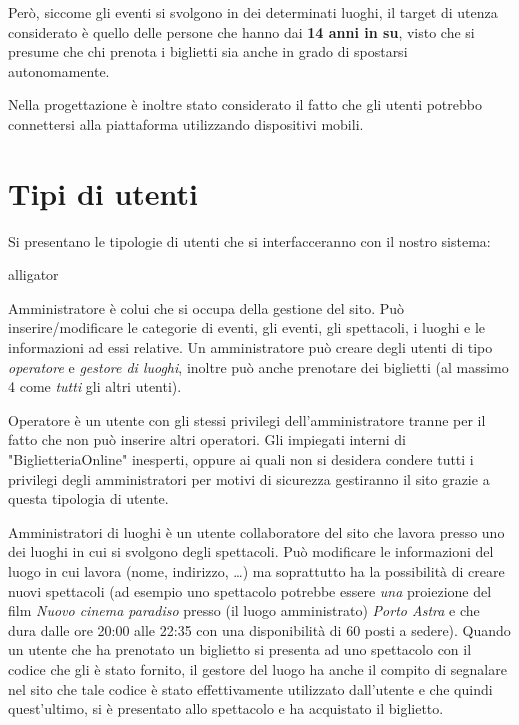 \documentclass[10pt, a4paper]{article}
\begin{document}
Però, siccome gli eventi si svolgono in dei determinati luoghi, il 
target di utenza considerato è quello delle persone che hanno dai
\textbf{14 anni in su}, visto che si presume che chi prenota i biglietti sia anche in grado 
di spostarsi autonomamente.

Nella progettazione è inoltre stato considerato il fatto che gli utenti potrebbo connettersi 
alla piattaforma utilizzando dispositivi mobili.

\section{Tipi di utenti}
Si presentano le tipologie di utenti che si interfacceranno con il nostro sistema:
\begin{labeling}{alligator}
	\item[Amministratore] è colui che si occupa della gestione del
    sito. Può inserire/modificare le categorie di eventi, gli eventi, gli spettacoli, i luoghi e le informazioni ad essi relative.
    Un amministratore può creare degli utenti di tipo \emph{operatore} e \emph{gestore di luoghi},
    inoltre può anche prenotare dei biglietti (al massimo 4 come \emph{tutti} gli altri utenti).
  	\item[Operatore] è un utente con gli stessi privilegi dell'amministratore tranne
    per il fatto che non può inserire altri operatori. Gli impiegati interni di "BiglietteriaOnline" inesperti, oppure ai quali non si desidera condere tutti i privilegi degli amministratori per motivi di sicurezza gestiranno il sito grazie a questa tipologia di utente.
	\item[Amministratori di luoghi] è un utente collaboratore del sito che lavora presso uno dei luoghi in cui
	si svolgono degli spettacoli. %
	Può modificare le informazioni del luogo in cui lavora (nome, indirizzo, \dots) 
	ma soprattutto ha la possibilità di creare nuovi spettacoli %
	 (ad esempio uno spettacolo potrebbe essere \emph{una} proiezione del film \textit{Nuovo cinema paradiso}
	 presso (il luogo amministrato) \textit{Porto Astra} e che dura dalle ore 20:00 alle 22:35 con 
	 una disponibilità di 60 posti a sedere). 
	 Quando un utente che ha prenotato un biglietto si presenta ad uno spettacolo con il codice che
	 gli è stato fornito, il gestore del luogo ha anche il compito di segnalare nel sito che tale codice è stato
	 effettivamente utilizzato dall'utente e che quindi quest'ultimo, si è presentato allo spettacolo e ha acquistato il biglietto.\\

\end{labeling}
\end{document}
